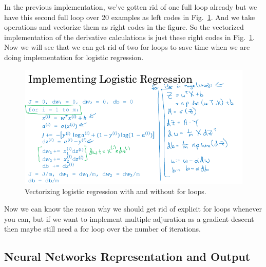 \documentclass[a4paper]{article}
\begin{document}
In the previous implementation, we've gotten rid of one full loop already but we have this second full loop over 20 examples as left codes in Fig.~\ref{p10}. And we take operations and vectorize them as right codes in the figure. So the vectorized implementation of the derivative calculations is just these right codes in Fig.~\ref{p10}. Now we will see that we can get rid of two for loops to save time when we are doing implementation for logistic regression.
\begin{figure}
	\begin{center}
		\includegraphics[scale=0.4]{figures/11.png}
	\end{center}
	\caption{Vectorizing logistic regression with and without for loops.}
	\label{p10}
\end{figure}

Now we can know the reason why we should get rid of explicit for loops whenever you can, but if we want to implement multiple adjuration as a gradient descent then maybe still need a for loop over the number of iterations.

\subsection{Neural Networks Representation and Output}
\end{document}
